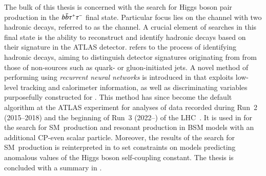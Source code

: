 The bulk of this thesis is concerned with the search for Higgs boson pair
production in the $b\bar{b}\tau^{+} \tau^{-}$ final state. Particular focus lies on the
channel with two hadronic \taulepton decays, referred to as the \hadhad channel.
A crucial element of searches in this final state is the ability to reconstruct
and identify hadronic \taulepton decays based on their signature in the ATLAS
detector. \emph{\Tauid} refers to the process of identifying hadronic \taulepton
decays, aiming to distinguish detector signatures originating from \tauhad from
those of non-\tauhad sources such as quark- or gluon-initiated jets. A novel
method of performing \tauid using \emph{recurrent neural networks} is introduced
in  that exploits low-level tracking and calorimeter
information, as well as discriminating variables purposefully constructed for
\tauid. This method has since become the default \tauid algorithm at the ATLAS
experiment for analyses of data recorded during Run~2 (2015--2018) and the
beginning of Run~3 (2022--) of the
LHC~\cite{ATL-PHYS-PUB-2019-033,ATL-PHYS-PUB-2022-044}. It is used in
 for the search for SM~\HH production and resonant \HH
production in BSM models with an additional CP-even scalar particle. Moreover,
the results of the search for SM~\HH production is reinterpreted in
 to set constraints on models predicting anomalous
values of the Higgs boson self-coupling constant. The thesis is
concluded with a summary in .


